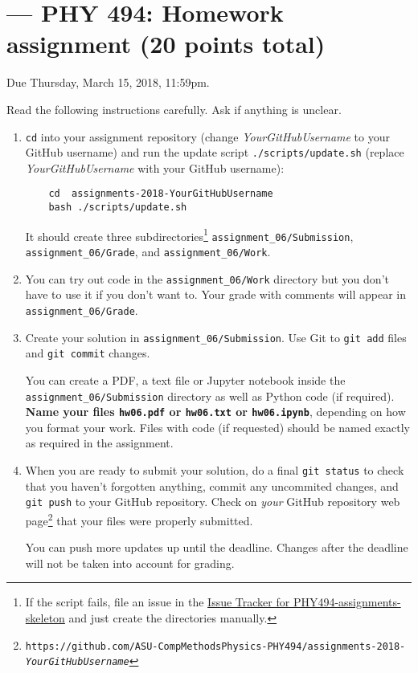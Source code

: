 \documentclass[letterpaper]{scrartcl}
\newcommand{\anumber}{6}
\newcommand{\anum}{0\anumber}
\begin{document}

\setcounter{section}{\anumber}
\addtocounter{section}{-1}
\section{ --- PHY 494: Homework assignment (20 points total)}

\noindent Due Thursday, March 15, 2018, 11:59pm.

\noindent
Read the following instructions carefully. Ask if anything is unclear.
\begin{enumerate}
\item \texttt{cd} into your assignment repository (change
  \emph{YourGitHubUsername} to your GitHub username) and run the
  update script \texttt{./scripts/update.sh} (replace
  \emph{YourGitHubUsername} with your GitHub username):
  \begin{verbatim}
    cd  assignments-2018-YourGitHubUsername
    bash ./scripts/update.sh
  \end{verbatim}
  It should create three subdirectories\footnote{If the script fails,
    file an issue in the
    \href{https://github.com/ASU-CompMethodsPhysics-PHY494/PHY494-assignments-skeleton/issues}{Issue
      Tracker for PHY494-assignments-skeleton} and just create the
    directories manually.} \texttt{assignment\_\anum/Submission},
  \texttt{assignment\_\anum/Grade}, and
  \texttt{assignment\_\anum/Work}.
\item You can try out code in the \texttt{assignment\_\anum/Work}
  directory but you don't have to use it if you don't want to. Your
  grade with comments will appear in
  \texttt{assignment\_\anum/Grade}.
\item Create your solution in
  \texttt{assignment\_\anum/Submission}. Use Git to \texttt{git
    add} files and \texttt{git commit} changes.

  You can create a PDF, a text file or Jupyter notebook inside the
  \texttt{assignment\_\anum/Submission} directory as well as Python
  code (if required). \textbf{Name your files \texttt{hw\anum.pdf} or
    \texttt{hw\anum.txt} or \texttt{hw\anum.ipynb}}, depending on how
  you format your work. Files with code (if requested) should be named
  exactly as required in the assignment.
\item When you are ready to submit your solution, do a final
  \texttt{git status} to check that you haven't forgotten anything,
  commit any uncommited changes, and \texttt{git push} to your GitHub
  repository. Check on \emph{your} GitHub repository web
  page\footnote{\texttt{https://github.com/ASU-CompMethodsPhysics-PHY494/assignments-2018-\emph{YourGitHubUsername}}}
  that your files were properly submitted.

  You can push more updates up until the deadline. Changes after the
  deadline will not be taken into account for grading.
\end{enumerate}
\end{document}
